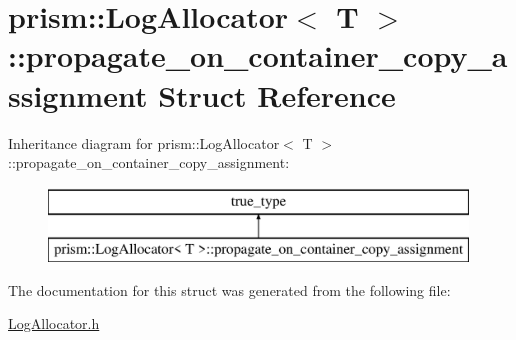 \hypertarget{structprism_1_1_log_allocator_1_1propagate__on__container__copy__assignment}{}\section{prism\+:\+:Log\+Allocator$<$ T $>$\+:\+:propagate\+\_\+on\+\_\+container\+\_\+copy\+\_\+assignment Struct Reference}
\label{structprism_1_1_log_allocator_1_1propagate__on__container__copy__assignment}
Inheritance diagram for prism\+:\+:Log\+Allocator$<$ T $>$\+:\+:propagate\+\_\+on\+\_\+container\+\_\+copy\+\_\+assignment\+:\begin{figure}[H]
\begin{center}
\leavevmode
\includegraphics[height=2.000000cm]{structprism_1_1_log_allocator_1_1propagate__on__container__copy__assignment}
\end{center}
\end{figure}


The documentation for this struct was generated from the following file\+:\begin{DoxyCompactItemize}
\item 
\hyperlink{_log_allocator_8h}{Log\+Allocator.\+h}\end{DoxyCompactItemize}
